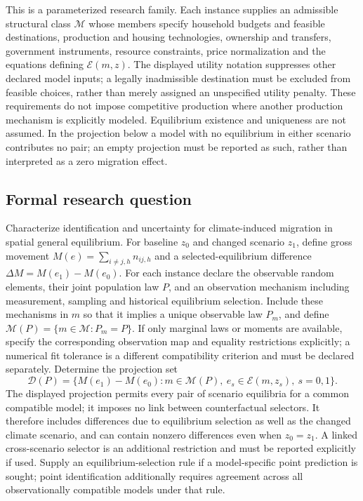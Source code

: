 \documentclass[11pt,a4paper]{article}
\begin{document}
This is a parameterized research family. Each instance supplies an admissible structural class $\mathcal M$ whose members specify household budgets and feasible destinations, production and housing technologies, ownership and transfers, government instruments, resource constraints, price normalization and the equations defining $\mathcal E(m,z)$. The displayed utility notation suppresses other declared model inputs; a legally inadmissible destination must be excluded from feasible choices, rather than merely assigned an unspecified utility penalty. These requirements do not impose competitive production where another production mechanism is explicitly modeled. Equilibrium existence and uniqueness are not assumed. In the projection below a model with no equilibrium in either scenario contributes no pair; an empty projection must be reported as such, rather than interpreted as a zero migration effect.

\subsection*{Formal research question}

Characterize identification and uncertainty for climate-induced migration in spatial general equilibrium. For baseline $z_0$ and changed scenario $z_1$, define gross movement $M(e)=\sum_{i\ne j,h}n_{ij,h}$ and a selected-equilibrium difference $\Delta M=M(e_1)-M(e_0)$. For each instance declare the observable random elements, their joint population law $P$, and an observation mechanism including measurement, sampling and historical equilibrium selection. Include these mechanisms in $m$ so that it implies a unique observable law $P_m$, and define $\mathcal M(P)=\{m\in\mathcal M:P_m=P\}$. If only marginal laws or moments are available, specify the corresponding observation map and equality restrictions explicitly; a numerical fit tolerance is a different compatibility criterion and must be declared separately. Determine the projection set
\[
\mathcal D(P)=
\{M(e_1)-M(e_0):m\in\mathcal M(P),
\ e_s\in\mathcal E(m,z_s),\ s=0,1\}.
\]
The displayed projection permits every pair of scenario equilibria for a common compatible model; it imposes no link between counterfactual selectors. It therefore includes differences due to equilibrium selection as well as the changed climate scenario, and can contain nonzero differences even when $z_0=z_1$. A linked cross-scenario selector is an additional restriction and must be reported explicitly if used. Supply an equilibrium-selection rule if a model-specific point prediction is sought; point identification additionally requires agreement across all observationally compatible models under that rule.
\end{document}
